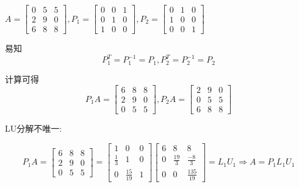\begin{example}[$PA=LU$]


    $ A=\left[\begin{array}{lll}0 & 5 & 5 \\ 2 & 9 & 0 \\ 6 & 8 & 8\end{array}\right], P_{1}=\left[\begin{array}{lll}0 & 0 & 1 \\ 0 & 1 & 0 \\ 1 & 0 & 0\end{array}\right], P_{2}=\left[\begin{array}{lll}0 & 1 & 0 \\ 1 & 0 & 0 \\ 0 & 0 & 1\end{array}\right] $

    易知
    \begin{equation}P_{1}^{T}=P_{1}^{-1}=P_{1}, P_{2}^{T}=P_{2}^{-1}=P_{2}\end{equation}

    计算可得
    \begin{equation} P_{1} A=\left[\begin{array}{lll}6 & 8 & 8 \\ 2 & 9 & 0 \\ 0 & 5 & 5\end{array}\right], P_{2} A=\left[\begin{array}{lll}2 & 9 & 0 \\ 0 & 5 & 5 \\ 6 & 8 & 8\end{array}\right] \end{equation}

    LU分解不唯一:

    \begin{equation}
        P_{1} A=\left[\begin{array}{lll}
                6 & 8 & 8 \\
                2 & 9 & 0 \\
                0 & 5 & 5
            \end{array}\right]=\left[\begin{array}{ccc}
                1           & 0             & 0 \\
                \frac{1}{3} & 1             & 0 \\
                0           & \frac{15}{19} & 1
            \end{array}\right]\left[\begin{array}{ccc}
                6 & 8            & 8              \\
                0 & \frac{19}{3} & \frac{-8}{3}   \\
                0 & 0            & \frac{135}{19}
            \end{array}\right]=L_{1} U_{1} \Rightarrow A=P_{1} L_{1} U_{1}
    \end{equation}



\end{example}

